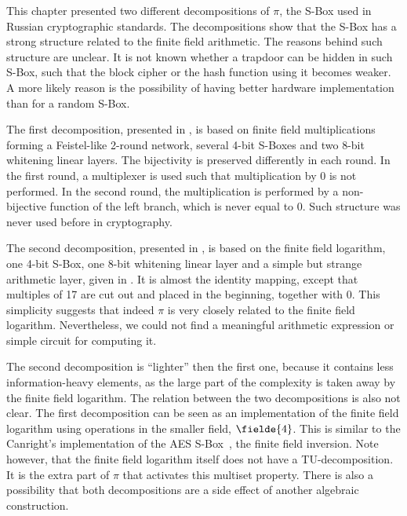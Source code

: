 
This chapter presented two different decompositions of $\pi$, the S-Box used in Russian cryptographic standards. The decompositions show that the S-Box has a strong structure related to the finite field arithmetic. The reasons behind such structure are unclear. It is not known whether a trapdoor can be hidden in such S-Box, such that the block cipher or the hash function using it becomes weaker. A more likely reason is the possibility of having better hardware implementation than for a random S-Box.

The first decomposition, presented in , is based on finite field multiplications forming a Feistel-like 2-round network, several 4-bit S-Boxes and two 8-bit whitening linear layers. The bijectivity is preserved differently in each round. In the first round, a multiplexer is used such that multiplication by 0 is not performed. In the second round, the multiplication is performed by a non-bijective function of the left branch, which is never equal to 0. Such structure was never used before in cryptography. 

The second decomposition, presented in , is based on the finite field logarithm, one 4-bit S-Box, one 8-bit whitening linear layer and a simple but strange arithmetic layer, given in . It is almost the identity mapping, except that multiples of 17 are cut out and placed in the beginning, together with 0. This simplicity suggests that indeed $\pi$ is very closely related to the finite field logarithm. Nevertheless, we could not find a meaningful arithmetic expression or simple circuit for computing it. 

The second decomposition is ``lighter'' then the first one, because it contains less information-heavy elements, as the large part of the complexity is taken away by the finite field logarithm. The relation between the two decompositions is also not clear. The first decomposition can be seen as an implementation of the finite field logarithm using operations in the smaller field, $\fielde{4}$. This is similar to the Canright's implementation of the AES S-Box~\cite{Canright}, the finite field inversion.
Note however, that the finite field logarithm itself does not have a TU-decomposition. It is the extra part of $\pi$ that activates this multiset property. There is also a possibility that both decompositions are a side effect of another algebraic construction.

